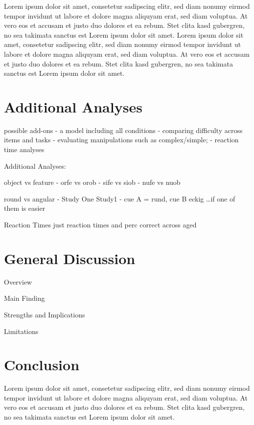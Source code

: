 \documentclass[
  man]{apa6}
\begin{document}
Lorem ipsum dolor sit amet, consetetur sadipscing elitr, sed diam nonumy eirmod tempor invidunt ut labore et dolore magna aliquyam erat, sed diam voluptua. At vero eos et accusam et justo duo dolores et ea rebum. Stet clita kasd gubergren, no sea takimata sanctus est Lorem ipsum dolor sit amet. Lorem ipsum dolor sit amet, consetetur sadipscing elitr, sed diam nonumy eirmod tempor invidunt ut labore et dolore magna aliquyam erat, sed diam voluptua. At vero eos et accusam et justo duo dolores et ea rebum. Stet clita kasd gubergren, no sea takimata sanctus est Lorem ipsum dolor sit amet.

\section{Additional Analyses}\label{additional-analyses}

possible add-ons
- a model including all conditions
- comparing difficulty across items and tasks
- evaluating manipulations such as complex/simple;
- reaction time analyses

Additional Analyses:

object vs feature
- orfe vs orob
- sife vs siob
- nufe vs nuob

round vs angular
- Study One Study1 - cue A = rund, cue B eckig \ldots if one of them is easier

Reaction Times
just reaction times and perc correct across aged

\section{General Discussion}\label{general-discussion}

Overview

Main Finding

Strengths and Implications

Limitations

\section{Conclusion}\label{conclusion}

Lorem ipsum dolor sit amet, consetetur sadipscing elitr, sed diam nonumy eirmod tempor invidunt ut labore et dolore magna aliquyam erat, sed diam voluptua. At vero eos et accusam et justo duo dolores et ea rebum. Stet clita kasd gubergren, no sea takimata sanctus est Lorem ipsum dolor sit amet.

\newpage
\end{document}
